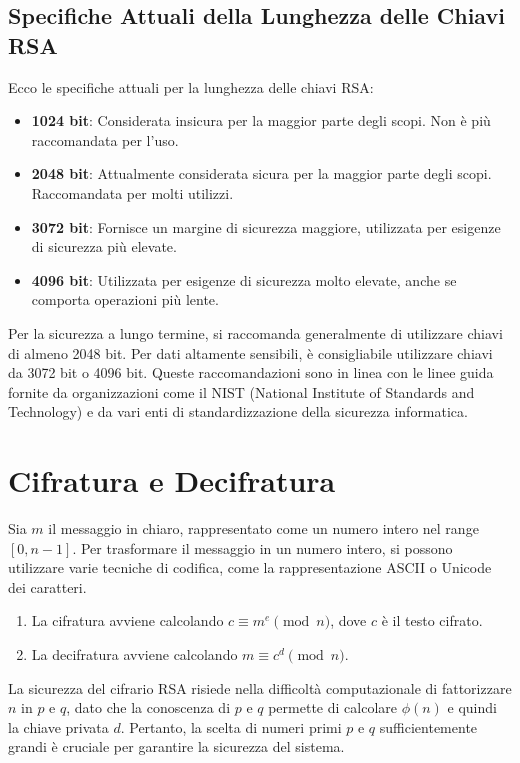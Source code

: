 \documentclass[a4paper,12pt]{report}
\begin{document}
\subsection*{Specifiche Attuali della Lunghezza delle Chiavi RSA}

Ecco le specifiche attuali per la lunghezza delle chiavi RSA:

\begin{itemize}
    \item \textbf{1024 bit}: Considerata insicura per la maggior parte degli scopi. Non è più raccomandata per l'uso.
    \item \textbf{2048 bit}: Attualmente considerata sicura per la maggior parte degli scopi. Raccomandata per molti utilizzi.
    \item \textbf{3072 bit}: Fornisce un margine di sicurezza maggiore, utilizzata per esigenze di sicurezza più elevate.
    \item \textbf{4096 bit}: Utilizzata per esigenze di sicurezza molto elevate, anche se comporta operazioni più lente.
\end{itemize}

Per la sicurezza a lungo termine, si raccomanda generalmente di utilizzare chiavi di almeno 2048 bit. Per dati altamente sensibili, è consigliabile utilizzare chiavi da 3072 bit o 4096 bit. 
Queste raccomandazioni sono in linea con le linee guida fornite da organizzazioni come il NIST (National Institute of Standards and Technology)\cite{nist} e da vari enti di standardizzazione della sicurezza informatica.

\section{Cifratura e Decifratura}
Sia $m$ il messaggio in chiaro, rappresentato come un numero intero nel range $[0, n - 1]$. Per trasformare il messaggio in un numero intero, si possono utilizzare varie tecniche di codifica, come la rappresentazione ASCII o Unicode dei caratteri.

\begin{enumerate}
    \item La cifratura avviene calcolando $c \equiv m^e \pmod{n}$, dove $c$ è il testo cifrato.
    \item La decifratura avviene calcolando $m \equiv c^d \pmod{n}$.
\end{enumerate}

La sicurezza del cifrario RSA risiede nella difficoltà computazionale di fattorizzare $n$ in $p$ e $q$, dato che la conoscenza di $p$ e $q$ permette di calcolare $\phi(n)$ e quindi la chiave privata $d$. Pertanto, la scelta di numeri primi $p$ e $q$ sufficientemente grandi è cruciale per garantire la sicurezza del sistema.
\end{document}
